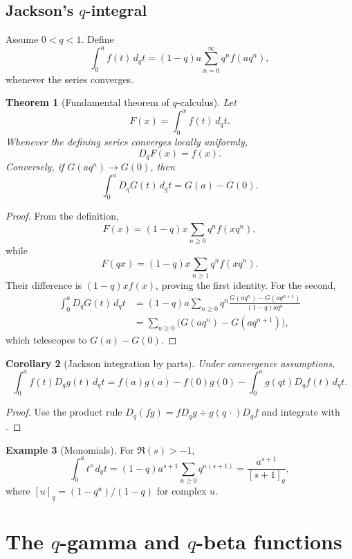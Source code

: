 \documentclass[11pt,oneside,openany]{book}
\newtheorem{theorem}{Theorem}[chapter]
\newtheorem{corollary}[theorem]{Corollary}
\theoremstyle{definition}
\newtheorem{example}[theorem]{Example}
\theoremstyle{remark}
\begin{document}
\section{Jackson's \texorpdfstring{$q$}{q}-integral}

Assume $0<q<1$.  Define
\[
 \int_0^a f(t)\,d_qt
 =(1-q)a\sum_{n=0}^{\infty}q^nf(aq^n),
\]
whenever the series converges.

\begin{theorem}[Fundamental theorem of $q$-calculus]\label{thm:q-fundamental}
Let
\[
 F(x)=\int_0^x f(t)\,d_qt.
\]
Whenever the defining series converges locally uniformly,
\[
 D_qF(x)=f(x).
\]
Conversely, if $G(aq^n)\to G(0)$, then
\[
 \int_0^aD_qG(t)\,d_qt=G(a)-G(0).
\]
\end{theorem}

\begin{proof}
From the definition,
\[
 F(x)=(1-q)x\sum_{n\ge0}q^nf(xq^n),
\]
while
\[
 F(qx)=(1-q)x\sum_{n\ge1}q^nf(xq^n).
\]
Their difference is $(1-q)xf(x)$, proving the first identity.  For the second,
\begin{align*}
 \int_0^aD_qG(t)\,d_qt
 &=(1-q)a\sum_{n\ge0}q^n
 \frac{G(aq^n)-G(aq^{n+1})}{(1-q)aq^n}\\
 &=\sum_{n\ge0}\bigl(G(aq^n)-G(aq^{n+1})\bigr),
\end{align*}
which telescopes to $G(a)-G(0)$.
\end{proof}

\begin{corollary}[Jackson integration by parts]\label{cor:q-integration-parts}
Under convergence assumptions,
\[
 \int_0^a f(t)D_qg(t)\,d_qt
 =f(a)g(a)-f(0)g(0)
 -\int_0^a g(qt)D_qf(t)\,d_qt.
\]
\end{corollary}

\begin{proof}
Use the product rule
\(
 D_q(fg)=fD_qg+g(q\,\cdot)D_qf
\)
and integrate with .
\end{proof}

\begin{example}[Monomials]
For $\Re(s)>-1$,
\[
 \int_0^a t^s\,d_qt
 =(1-q)a^{s+1}\sum_{n\ge0}q^{n(s+1)}
 =\frac{a^{s+1}}{[s+1]_q},
\]
where $[u]_q=(1-q^u)/(1-q)$ for complex $u$.
\end{example}

\chapter{The \texorpdfstring{$q$}{q}-gamma and \texorpdfstring{$q$}{q}-beta functions}\label{chap:qgamma}
\end{document}
